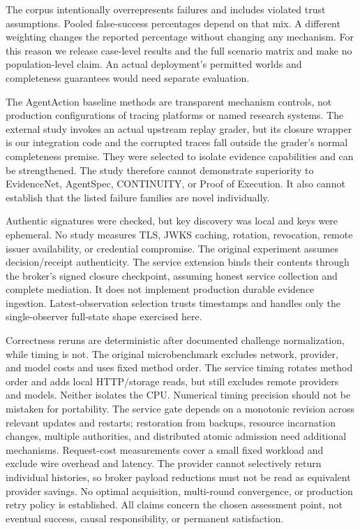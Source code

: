 \documentclass[11pt]{article}
\begin{document}
The corpus intentionally overrepresents failures and includes violated trust assumptions. Pooled false-success percentages depend on that mix. A different weighting changes the reported percentage without changing any mechanism. For this reason we release case-level results and the full scenario matrix and make no population-level claim. An actual deployment's permitted worlds and completeness guarantees would need separate evaluation.

The AgentAction baseline methods are transparent mechanism controls, not production configurations of tracing platforms or named research systems. The external study invokes an actual upstream replay grader, but its closure wrapper is our integration code and the corrupted traces fall outside the grader's normal completeness premise. They were selected to isolate evidence capabilities and can be strengthened. The study therefore cannot demonstrate superiority to EvidenceNet, AgentSpec, CONTINUITY, or Proof of Execution. It also cannot establish that the listed failure families are novel individually.

Authentic signatures were checked, but key discovery was local and keys were ephemeral. No study measures TLS, JWKS caching, rotation, revocation, remote issuer availability, or credential compromise. The original experiment assumes decision/receipt authenticity. The service extension binds their contents through the broker's signed closure checkpoint, assuming honest service collection and complete mediation. It does not implement production durable evidence ingestion. Latest-observation selection trusts timestamps and handles only the single-observer full-state shape exercised here.

Correctness reruns are deterministic after documented challenge normalization, while timing is not. The original microbenchmark excludes network, provider, and model costs and uses fixed method order. The service timing rotates method order and adds local HTTP/storage reads, but still excludes remote providers and models. Neither isolates the CPU. Numerical timing precision should not be mistaken for portability. The service gate depends on a monotonic revision across relevant updates and restarts; restoration from backups, resource incarnation changes, multiple authorities, and distributed atomic admission need additional mechanisms. Request-cost measurements cover a small fixed workload and exclude wire overhead and latency. The provider cannot selectively return individual histories, so broker payload reductions must not be read as equivalent provider savings. No optimal acquisition, multi-round convergence, or production retry policy is established. All claims concern the chosen assessment point, not eventual success, causal responsibility, or permanent satisfaction.
\end{document}

